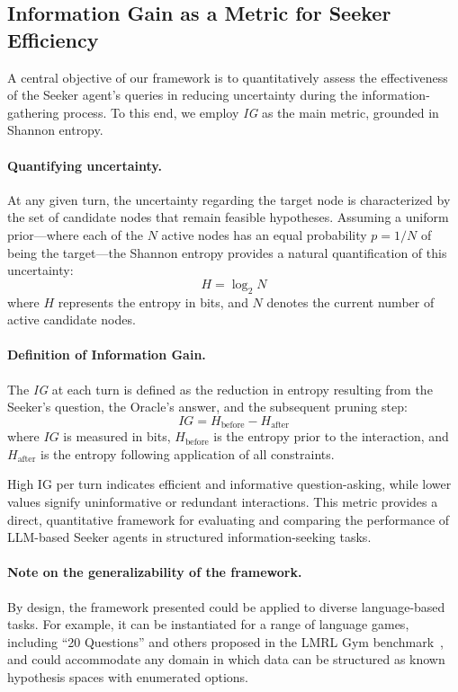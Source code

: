 \documentclass[letterpaper]{article} %
\begin{document}
\subsection{Information Gain as a Metric for Seeker Efficiency}

A central objective of our framework is to quantitatively assess the effectiveness of the Seeker agent's queries in reducing uncertainty during the information-gathering process. To this end, we employ \emph{IG} as the main metric, grounded in Shannon entropy.

\paragraph{Quantifying uncertainty.} At any given turn, the uncertainty regarding the target node is characterized by the set of candidate nodes that remain feasible hypotheses. Assuming a uniform prior—where each of the $N$ active nodes has an equal probability $p = 1/N$ of being the target—the Shannon entropy provides a natural quantification of this uncertainty:
\begin{equation}
    H = \log_2 N
\end{equation}
where $H$ represents the entropy in bits, and $N$ denotes the current number of active candidate nodes.

\paragraph{Definition of Information Gain.} The \emph{IG} at each turn is defined as the reduction in entropy resulting from the Seeker's question, the Oracle's answer, and the subsequent pruning step:
\begin{equation}
    IG = H_{\mathrm{before}} - H_{\mathrm{after}}
\end{equation}
where \( IG \) is measured in bits, \( H_{\mathrm{before}} \) is the entropy prior to the interaction, and \( H_{\mathrm{after}} \) is the entropy following application of all constraints.

High IG per turn indicates efficient and informative question-asking, while lower values signify uninformative or redundant interactions. This metric provides a direct, quantitative framework for evaluating and comparing the performance of LLM-based Seeker agents in structured information-seeking tasks.

\paragraph{Note on the generalizability of the framework.} By design, the framework presented could be applied to diverse language-based tasks. For example, it can be instantiated for a range of language games, including ``20 Questions'' and others proposed in the LMRL Gym benchmark~\cite{abdulhai2023lmrlgymbenchmarksmultiturn}, and could accommodate any domain in which data can be structured as known hypothesis spaces with enumerated options.
\end{document}
